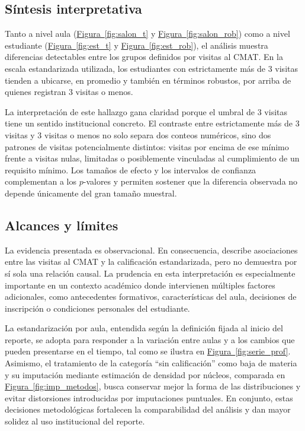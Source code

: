\documentclass[10pt,letterpaper]{article} %
\numberwithin{figure}{subsection}
\begin{document}
\subsection{Síntesis interpretativa}
Tanto a nivel aula (\hyperref[fig:salon_t]{Figura~\ref{fig:salon_t}} y \hyperref[fig:salon_rob]{Figura~\ref{fig:salon_rob}}) como a nivel estudiante (\hyperref[fig:est_t]{Figura~\ref{fig:est_t}} y \hyperref[fig:est_rob]{Figura~\ref{fig:est_rob}}), el análisis muestra diferencias detectables entre los grupos definidos por visitas al CMAT. En la escala estandarizada utilizada, los estudiantes con estrictamente más de 3 visitas tienden a ubicarse, en promedio y también en términos robustos, por arriba de quienes registran 3 visitas o menos.

La interpretación de este hallazgo gana claridad porque el umbral de 3 visitas tiene un sentido institucional concreto. El contraste entre estrictamente más de 3 visitas y 3 visitas o menos no solo separa dos conteos numéricos, sino dos patrones de visitas potencialmente distintos: visitas por encima de ese mínimo frente a visitas nulas, limitadas o posiblemente vinculadas al cumplimiento de un requisito mínimo. Los tamaños de efecto y los intervalos de confianza complementan a los $p$-valores y permiten sostener que la diferencia observada no depende únicamente del gran tamaño muestral.

\subsection{Alcances y límites}
La evidencia presentada es observacional. En consecuencia, describe asociaciones entre las visitas al CMAT y la calificación estandarizada, pero no demuestra por sí sola una relación causal. La prudencia en esta interpretación es especialmente importante en un contexto académico donde intervienen múltiples factores adicionales, como antecedentes formativos, características del aula, decisiones de inscripción o condiciones personales del estudiante.

La estandarización por aula, entendida según la definición fijada al inicio del reporte, se adopta para responder a la variación entre aulas y a los cambios que pueden presentarse en el tiempo, tal como se ilustra en \hyperref[fig:serie_prof]{Figura~\ref{fig:serie_prof}}. Asimismo, el tratamiento de la categoría ``sin calificación'' como baja de materia y su imputación mediante estimación de densidad por núcleos, comparada en \hyperref[fig:imp_metodos]{Figura~\ref{fig:imp_metodos}}, busca conservar mejor la forma de las distribuciones y evitar distorsiones introducidas por imputaciones puntuales. En conjunto, estas decisiones metodológicas fortalecen la comparabilidad del análisis y dan mayor solidez al uso institucional del reporte.
\end{document}
